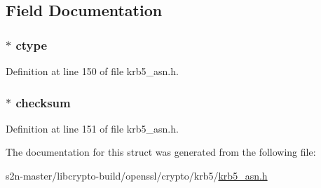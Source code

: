 \subsection{Field Documentation}
\subsubsection[{\texorpdfstring{ctype}{ctype}}]{ $\ast$ ctype}\hypertarget{structkrb5__checksum__st_affcb86df0d94a51a34855a1858e2934d}{}\label{structkrb5__checksum__st_affcb86df0d94a51a34855a1858e2934d}


Definition at line 150 of file krb5\+\_\+asn.\+h.

\subsubsection[{\texorpdfstring{checksum}{checksum}}]{ $\ast$ checksum}\hypertarget{structkrb5__checksum__st_a6c5e04de8c6704cd6c9614b82a597c08}{}\label{structkrb5__checksum__st_a6c5e04de8c6704cd6c9614b82a597c08}


Definition at line 151 of file krb5\+\_\+asn.\+h.



The documentation for this struct was generated from the following file\+:\begin{DoxyCompactItemize}
\item 
s2n-\/master/libcrypto-\/build/openssl/crypto/krb5/\hyperlink{crypto_2krb5_2krb5__asn_8h}{krb5\+\_\+asn.\+h}\end{DoxyCompactItemize}
